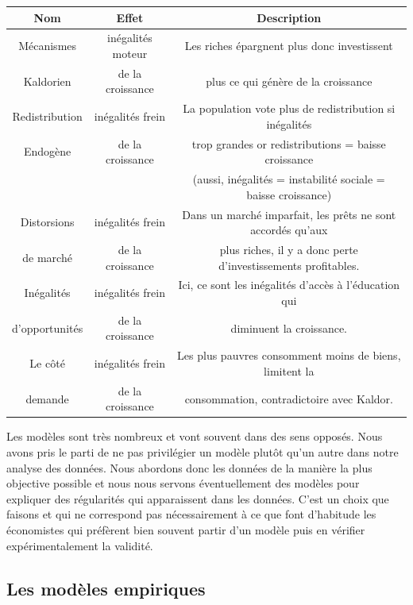 \documentclass[11pt,a4paper]{article}
\begin{document}
\begin{tabular}{| c | c | c |}
\hline
Nom & Effet &  Description \\
  \hline			
Mécanismes & inégalités moteur &  Les riches épargnent plus donc investissent \\
Kaldorien &  de la croissance &   plus ce qui génère de la croissance \\
  \hline			
  
Redistribution & inégalités frein  &  La population vote plus de redistribution si inégalités  \\
Endogène & de la croissance & trop grandes or redistributions = baisse croissance  \\
 &  & (aussi, inégalités = instabilité sociale = baisse croissance) \\

  \hline			
Distorsions  & inégalités frein & Dans un marché imparfait, les prêts ne sont accordés qu'aux \\
de marché & de la croissance &  plus riches, il y a donc perte d'investissements profitables.  \\
  \hline			

Inégalités  & inégalités frein & Ici, ce sont les inégalités d'accès à l'éducation qui \\
d'opportunités & de la croissance &  diminuent la croissance.   \\
  \hline			

Le côté  & inégalités frein & Les plus pauvres consomment moins de biens, limitent la \\
demande & de la croissance & consommation, contradictoire avec Kaldor.  \\
  \hline	
\end{tabular}

\bigskip

Les modèles sont très nombreux et vont souvent dans des sens opposés. Nous avons pris le parti de ne pas privilégier un modèle plutôt qu'un autre dans notre analyse des données. Nous abordons donc les données de la manière la plus objective possible et nous nous servons éventuellement des modèles pour expliquer des régularités qui apparaissent dans les données. C'est un choix que faisons et qui ne correspond pas nécessairement à ce que font d'habitude les économistes qui préfèrent bien souvent partir d'un modèle puis en vérifier expérimentalement la validité. 

\subsection{Les modèles empiriques}
\end{document}
